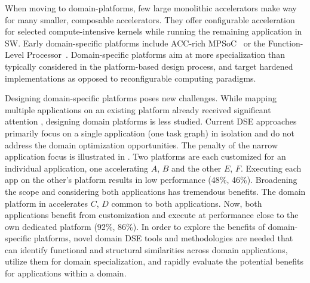 When moving to domain-platforms, few large monolithic accelerators make way for many smaller, composable accelerators. They offer configurable acceleration for selected compute-intensive kernels while running the remaining application in SW. Early domain-specific platforms include ACC-rich MPSoC~\cite{cong2014accelerator} or the Function-Level Processor~\cite{tabkhi2016function}. Domain-specific platforms aim at more specialization than typically considered in the platform-based design process, and target hardened implementations as opposed to reconfigurable computing  \cite{wildermann2011operational} paradigms.


Designing domain-specific platforms poses new challenges. 
While mapping multiple applications on an existing platform already received significant attention   \cite{kuang2005partitioning,wu2006low,abdeen2014multi,tang2015hardware}, 
designing domain platforms is less studied. 
Current DSE approaches primarily focus on a single application (one task graph) in isolation and do not address the domain optimization opportunities. 
The penalty of the narrow application focus is illustrated in . Two platforms are each customized for an individual application, one accelerating $A$, $B$ and the other $E$, $F$. Executing each app on the other's platform results in low performance (48\%, 46\%).  Broadening the scope and considering both applications has tremendous benefits. The domain platform in  accelerates $C$, $D$ common to both applications. Now, both applications benefit from customization and execute at performance close to the own dedicated platform (92\%, 86\%). In order to explore the benefits of domain-specific platforms,  novel domain DSE tools and methodologies are needed that can identify functional and structural similarities across domain applications, utilize them for domain specialization, and rapidly evaluate the potential benefits for applications within a domain.


